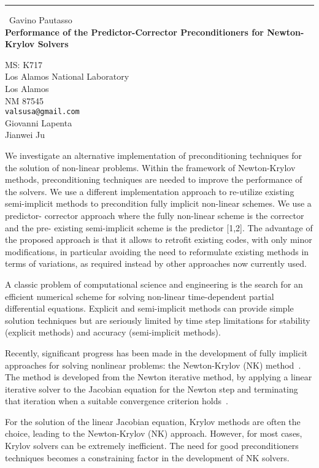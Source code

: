 \documentclass{report}
\begin{document}
\begin{center}
\rule{6in}{1pt} \
{\large Gavino Pautasso \\
{\bf Performance of the Predictor-Corrector Preconditioners for Newton-Krylov Solvers }}

MS: K717 \\ Los Alamos National Laboratory \\ Los Alamos \\ NM 87545
\\
{\tt valsusa@gmail.com}\\
Giovanni Lapenta\\
Jianwei Ju\end{center}

We investigate an alternative implementation of preconditioning techniques for the
solution of non-linear problems. Within the framework of Newton-Krylov methods,
preconditioning techniques are needed to improve the performance of the solvers.
We use a different implementation approach to re-utilize existing semi-implicit
methods to precondition fully implicit non-linear schemes. We use a predictor-
corrector approach where the fully non-linear scheme is the corrector and the pre-
existing semi-implicit scheme is the predictor [1,2]. The advantage of
the proposed approach is that it allows to retrofit existing codes, with
only minor modifications, in particular avoiding the need to reformulate
existing methods in terms of variations,
as required instead by other approaches now currently used.

A classic problem of computational science and engineering is the
search for an efficient numerical scheme for solving non-linear
time-dependent partial differential equations. Explicit and
semi-implicit methods can provide simple solution techniques but are
seriously limited by time step limitations for stability (explicit
methods) and accuracy (semi-implicit methods).

Recently, significant progress has been made in the development of
fully implicit approaches for solving nonlinear problems: the
Newton-Krylov (NK) method~\cite{kelley,saad-nlkrylov}. The method is developed
from the Newton iterative method, by applying a linear iterative
solver to the Jacobian equation for the Newton step and terminating
that iteration when a suitable convergence criterion
holds~\cite{convergence}.

For the solution of the linear Jacobian equation, Krylov methods are
often the choice, leading to the Newton-Krylov (NK) approach.
However, for most cases, Krylov solvers can be extremely
inefficient. The need for good preconditioners techniques becomes a
constraining factor in the development of NK solvers.
\end{document}
